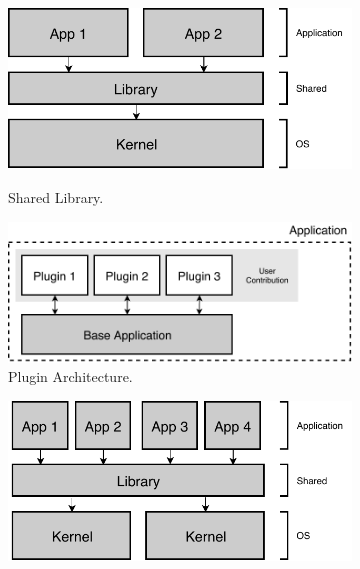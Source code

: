\begin{figure}[th!]
	\centering
	\begin{subfigure}[t]{.45\textwidth}
		\centering
		\captionsetup{width=.9\linewidth}
		{\includegraphics[width=\linewidth]{images/shared-library.pdf}}
		\caption{Shared Library.}
		\label{fig:shared-library}
	\end{subfigure}\hfill%
	\begin{subfigure}[t]{.55\textwidth}
		\centering
		\captionsetup{width=.9\linewidth}
		\includegraphics[width=\linewidth]{images/plugin.pdf}
		\caption{Plugin Architecture.}
		\label{fig:plugin}
	\end{subfigure}\vspace{0.5cm}\hfill%
	\begin{subfigure}[t]{.45\textwidth}
		\centering
		\captionsetup{width=.9\linewidth}
		\includegraphics[width=\linewidth]{images/cross-platform.pdf}

\end{subfigure}
\end{figure}
